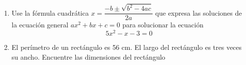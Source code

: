 \documentclass[letterpaper,fleqn]{article}
\begin{document}
\begin{enumerate}
\begin{enumerate}
\end{enumerate} \noanswer
\item Use la fórmula cuadrática $x=\dfrac{-b\pm \sqrt{b^{2}-4ac}}{2a}$ que expresa las soluciones de la ecuación general $ax^{2}+bx+c=0$ para solucionar la ecuación
\[5x^{2}-x-3=0\]\noanswer
\item El perímetro de un rectángulo es 56 cm. El largo del rectángulo es tres veces su ancho. Encuentre las dimensiones del rectángulo\noanswer
 \end{enumerate}
\end{document}
